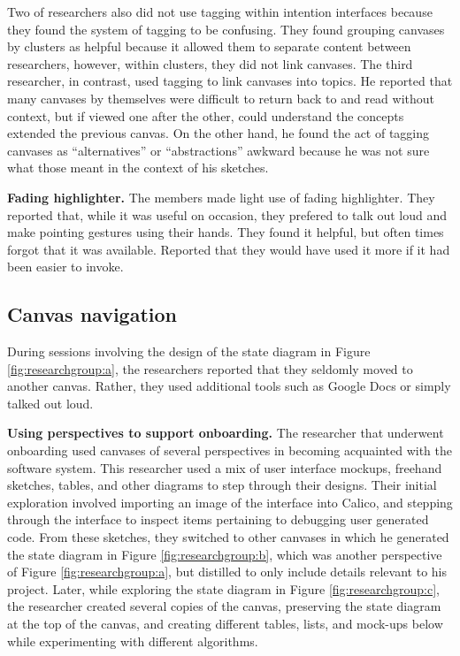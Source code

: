 Two of researchers also did not use tagging within intention interfaces because they found the system of tagging to be confusing. They found grouping canvases by clusters as helpful because it allowed them to separate content between researchers, however, within clusters, they did not link canvases. The third researcher, in contrast, used tagging to link canvases into topics. He reported that many canvases by themselves were difficult to return back to and read without context, but if viewed one after the other, could understand the concepts extended the previous canvas. On the other hand, he found the act of tagging canvases as ``alternatives'' or ``abstractions'' awkward because he was not sure what those meant in the context of his sketches.


\textbf{Fading highlighter.} The members made light use of fading highlighter. They reported that, while it was useful on occasion, they prefered to talk out loud and make pointing gestures using their hands. They found it helpful, but often times forgot that it was available. Reported that they would have used it more if it had been easier to invoke.

\subsection{Canvas navigation}

During sessions involving the design of the state diagram in Figure \ref{fig:researchgroup:a}, the researchers reported that they seldomly moved to another canvas. Rather, they used additional tools such as Google Docs or simply talked out loud.

\textbf{Using perspectives to support onboarding.} The researcher that underwent onboarding used canvases of several perspectives in becoming acquainted with the software system. This researcher used a mix of user interface mockups, freehand sketches, tables, and other diagrams to step through their designs. Their initial exploration involved importing an image of the interface into Calico,  and stepping through the interface to inspect items pertaining to debugging user generated code. From these sketches, they switched to other canvases in which he generated the state diagram in Figure \ref{fig:researchgroup:b}, which was another perspective of Figure \ref{fig:researchgroup:a}, but distilled to only include details relevant to his project. Later, while exploring the state diagram in Figure \ref{fig:researchgroup:c}, the researcher created several copies of the canvas, preserving the state diagram at the top of the canvas, and creating different tables, lists, and mock-ups below while experimenting with different algorithms.

